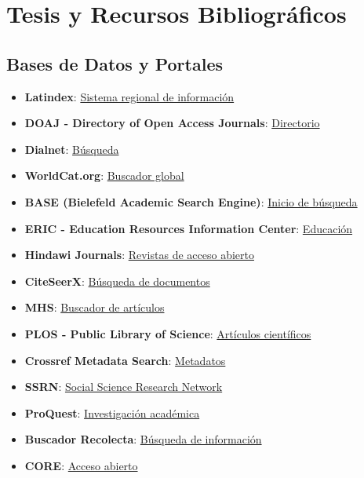 \documentclass[
  jou,
  floatsintext,
  longtable,
  a4paper,
  nolmodern,
  notxfonts,
  notimes,
  colorlinks=true,linkcolor=blue,citecolor=blue,urlcolor=blue]{apa7}
\providecommand{\tightlist}{%
  \setlength{\itemsep}{0pt}\setlength{\parskip}{0pt}}
\begin{document}
\section{Tesis y Recursos
Bibliográficos}\label{tesis-y-recursos-bibliogruxe1ficos}

\subsection{Bases de Datos y Portales}\label{bases-de-datos-y-portales}

\begin{itemize}
\tightlist
\item
  \textbf{Latindex}: \href{https://www.latindex.org/}{Sistema regional
  de información}
\item
  \textbf{DOAJ - Directory of Open Access Journals}:
  \href{https://doaj.org/}{Directorio}
\item
  \textbf{Dialnet}: \href{https://dialnet.unirioja.es/}{Búsqueda}
\item
  \textbf{WorldCat.org}: \href{https://search.worldcat.org/es}{Buscador
  global}
\item
  \textbf{BASE (Bielefeld Academic Search Engine)}:
  \href{https://www.base-search.net/}{Inicio de búsqueda}
\item
  \textbf{ERIC - Education Resources Information Center}:
  \href{https://eric.ed.gov/}{Educación}
\item
  \textbf{Hindawi Journals}:
  \href{https://www.hindawi.com/journals/}{Revistas de acceso abierto}
\item
  \textbf{CiteSeerX}: \href{https://citeseerx.ist.psu.edu/}{Búsqueda de
  documentos}
\item
  \textbf{MHS}: \href{https://jurn.org/}{Buscador de artículos}
\item
  \textbf{PLOS - Public Library of Science}:
  \href{https://plos.org/}{Artículos científicos}
\item
  \textbf{Crossref Metadata Search}:
  \href{https://search.crossref.org/}{Metadatos}
\item
  \textbf{SSRN}: \href{https://www.ssrn.com/index.cfm/en/}{Social
  Science Research Network}
\item
  \textbf{ProQuest}:
  \href{https://www.proquest.com/?defaultdiss=true}{Investigación
  académica}
\item
  \textbf{Buscador Recolecta}:
  \href{https://buscador.recolecta.fecyt.es/}{Búsqueda de información}
\item
  \textbf{CORE}: \href{https://core.ac.uk/}{Acceso abierto}

\end{itemize}
\end{document}
